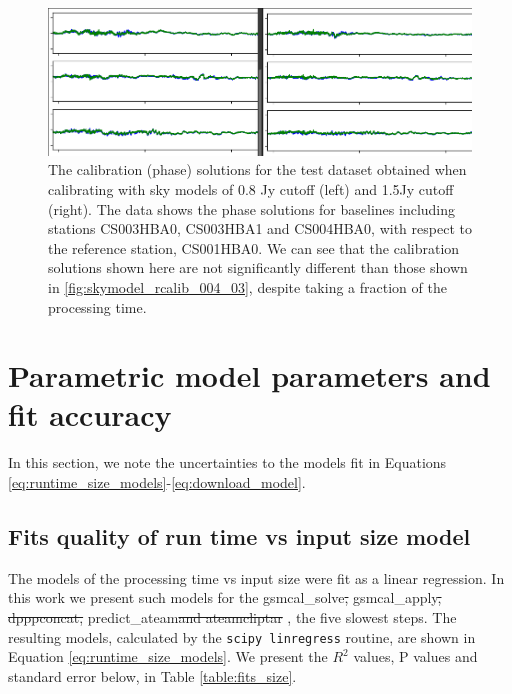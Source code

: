\documentclass[preprint,5p]{elsarticle}
\providecommand{\DIFadd}[1]{{\protect\color{blue}\uwave{#1}}} %
\providecommand{\DIFdel}[1]{{\protect\color{red}\sout{#1}}}                      %
\providecommand{\DIFaddbegin}{} %
\providecommand{\DIFaddend}{} %
\providecommand{\DIFdelbegin}{} %
\providecommand{\DIFdelend}{} %
\providecommand{\DIFaddendFL}{} %
\newcommand{\DIFscaledelfig}{0.5}
\newlength{\DIFdelgraphicswidth} %
\newlength{\DIFdelgraphicsheight} %
\newcommand{\DIFaddincludegraphics}[2][]{{\color{blue}\fbox{\DIFOincludegraphics[#1]{#2}}}} %
\newcommand{\DIFdelincludegraphics}[2][]{%
\sbox{\DIFdelgraphicsbox}{\DIFOincludegraphics[#1]{#2}}%
\settoboxwidth{\DIFdelgraphicswidth}{\DIFdelgraphicsbox} %
\settoboxtotalheight{\DIFdelgraphicsheight}{\DIFdelgraphicsbox} %
\scalebox{\DIFscaledelfig}{%
\parbox[b]{\DIFdelgraphicswidth}{\usebox{\DIFdelgraphicsbox}\\[-\baselineskip] \rule{\DIFdelgraphicswidth}{0em}}\llap{\resizebox{\DIFdelgraphicswidth}{\DIFdelgraphicsheight}{%
\setlength{\unitlength}{\DIFdelgraphicswidth}%
\begin{picture}(1,1)%
\thicklines\linethickness{2pt} %
{\color[rgb]{1,0,0}\put(0,0){\framebox(1,1){}}}%
{\color[rgb]{1,0,0}\put(0,0){\line( 1,1){1}}}%
{\color[rgb]{1,0,0}\put(0,1){\line(1,-1){1}}}%
\end{picture}%
}\hspace*{3pt}}} %
} %
\DeclareRobustCommand{\DIFaddbegin}{\DIFOaddbegin \let\includegraphics\DIFaddincludegraphics} %
\DeclareRobustCommand{\DIFaddend}{\DIFOaddend \let\includegraphics\DIFOincludegraphics} %
\DeclareRobustCommand{\DIFdelbegin}{\DIFOdelbegin \let\includegraphics\DIFdelincludegraphics} %
\DeclareRobustCommand{\DIFdelend}{\DIFOaddend \let\includegraphics\DIFOincludegraphics} %
\DeclareRobustCommand{\DIFaddendFL}{\DIFOaddendFL \let\includegraphics\DIFOincludegraphics} %
\begin{document}
\begin{figure}
    \DIFaddendFL \includegraphics[width=0.95\linewidth]{figures/08_and_15_solutsions_CS003HBA0_CS003HBA1_CS004HBA0.png}
      \caption{The calibration (phase) solutions for the test dataset obtained when calibrating with sky models of 0.8 Jy cutoff (left) and 1.5Jy cutoff (right). The data shows the phase solutions for baselines including stations CS003HBA0, CS003HBA1 and CS004HBA0, with respect to the reference station, CS001HBA0. We can see that the calibration solutions shown here are not significantly different than those shown in \ref{fig:skymodel_rcalib_004_03}, despite taking a fraction of the processing time.  }
	\label{fig:skymodel_rcalib_08_15}
\end{figure}

\section{Parametric model parameters and fit accuracy}\label{ap:model_params}

In this section, we note the uncertainties to the models fit in Equations \ref{eq:runtime_size_models}-\ref{eq:download_model}. 

\setcounter{equation}{6}
\renewcommand{\theequation}{\Alph{section}.\arabic{equation}}

\subsection{Fits quality of run time vs input size model}

The models of the processing time vs input size were fit as a linear regression. In this work we present such models for the \DIFaddbegin {\selectfont  \DIFaddend gsmcal\_solve\DIFdelbegin \DIFdel{, }\DIFdelend \DIFaddbegin }\DIFadd{, }{\selectfont \DIFaddend gsmcal\_apply\DIFdelbegin \DIFdel{, dpppconcat, }\DIFdelend \DIFaddbegin }\DIFadd{, }{\selectfont \DIFadd{dpppconcat}}\DIFadd{, }{\selectfont \DIFaddend predict\_ateam\DIFdelbegin \DIFdel{and ateamcliptar}\DIFdelend \DIFaddbegin } \DIFadd{and }{\selectfont \DIFadd{ateamcliptar}}\DIFaddend , the five slowest steps. The resulting models, calculated by the \texttt{scipy linregress}\citep{scipy} routine, are shown in Equation \ref{eq:runtime_size_models}. We present the $R^2$ values, P values and standard error below, in Table \ref{table:fits_size}.
\end{document}
